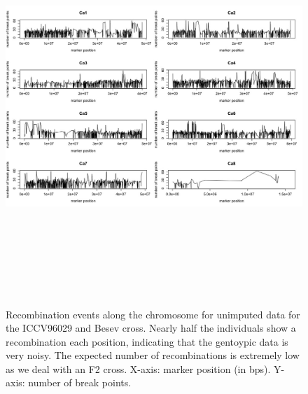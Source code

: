 \begin{figure}
    \centering
    \includegraphics[height = 15cm, width = 15cm]{tex/chickpea/unimputed-res.jpeg}
    \caption{Recombination events along the chromosome for unimputed data for the ICCV96029 and Besev cross. Nearly half the individuals show a recombination each position, indicating that the gentoypic data is very noisy. The expected number of recombinations is extremely low as we deal with an F2 cross. X-axis: marker position (in bps). Y-axis: number of break points.}
    \label{fig:unimputed-res}
\end{figure}

